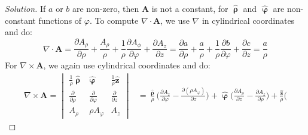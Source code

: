 \documentclass[crop=false,class=book,oneside]{standalone}
\begin{document}
            \begin{proof}[Solution]
                If $a$ or $b$ are non-zero, then $\mathbf{A}$
                is not a constant, for
                $\hat{\boldsymbol{\uprho}}$ and
                $\hat{\boldsymbol{\upvarphi}}$ are
                non-constant functions of $\varphi$. To compute
                $\nabla\cdot\mathbf{A}$, we use $\nabla$ in
                cylindrical coordinates and do:
                \begin{equation*}
                    \nabla\cdot\mathbf{A}
                    =\frac{\partial{A_{\rho}}}{\partial\rho}
                    +\frac{A_{\rho}}{\rho}
                    +\frac{1}{\rho}
                     \frac{\partial{A_{\phi}}}{\partial\varphi}
                    +\frac{\partial{A_{z}}}{\partial{z}}
                    =\frac{\partial{a}}{\partial\rho}
                    +\frac{a}{\rho}
                    +\frac{1}{\rho}
                     \frac{\partial{b}}{\partial\varphi}
                    +\frac{\partial{c}}{\partial{z}}
                    =\frac{a}{\rho}
                \end{equation*}
                For $\nabla\times\mathbf{A}$,
                we again use cylindrical coordinates and do:
                \begin{align*}
                    \nabla\times\mathbf{A}
                    =
                    \begin{vmatrix}
                        \frac{1}{\rho}\hat{\boldsymbol{\uprho}}
                        &\hat{\boldsymbol{\upvarphi}}
                        &\frac{1}{\rho}\hat{\mathbf{z}}\\
                        \frac{\partial}{\partial\rho}
                        &\frac{\partial}{\partial\varphi}
                        &\frac{\partial}{\partial{z}}\\
                        A_{\rho}
                        &\rho{A_{\varphi}}
                        &A_{z}
                    \end{vmatrix}
                    &=\frac{\hat{\boldsymbol{\uprho}}}{\rho}\bigg(
                        \frac{\partial{A_{z}}}{\partial\varphi}
                        -\frac{\partial(\rho{A_{\varphi}})}
                              {\partial{z}}
                    \bigg)
                    +\hat{\boldsymbol{\upvarphi}}\bigg(
                        \frac{\partial{A_{\rho}}}{\partial{z}}
                        -\frac{\partial{A_{z}}}{\partial\rho}
                    \bigg)
                    +\frac{\hat{\mathbf{z}}}{\rho}\bigg(

\end{align*}
\end{proof}
\end{document}
